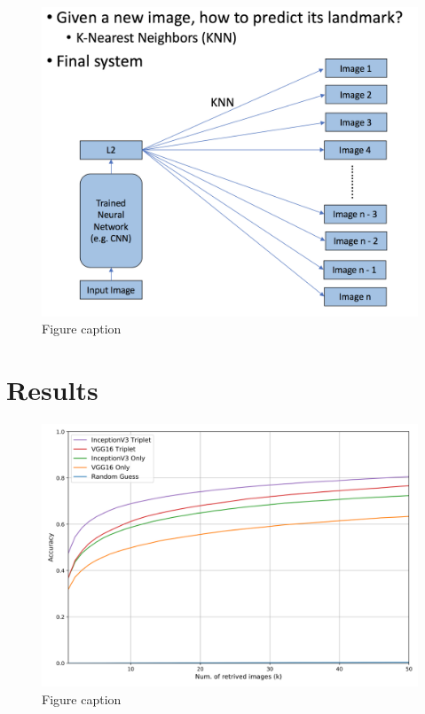 \documentclass[final,3p]{elsarticle}
\begin{document}
\begin{figure}[hbtp]
\centering\includegraphics[width=1.0\linewidth]{./figures/system.png}
\caption{Figure caption}
\label{fig:problem}
\end{figure}



\section{Results}
\label{S:4}
\begin{figure}[hbtp]
\centering\includegraphics[width=0.8\linewidth]{./figures/accuracy.png}
\caption{Figure caption}
\label{fig:problem}
\end{figure}
\end{document}

